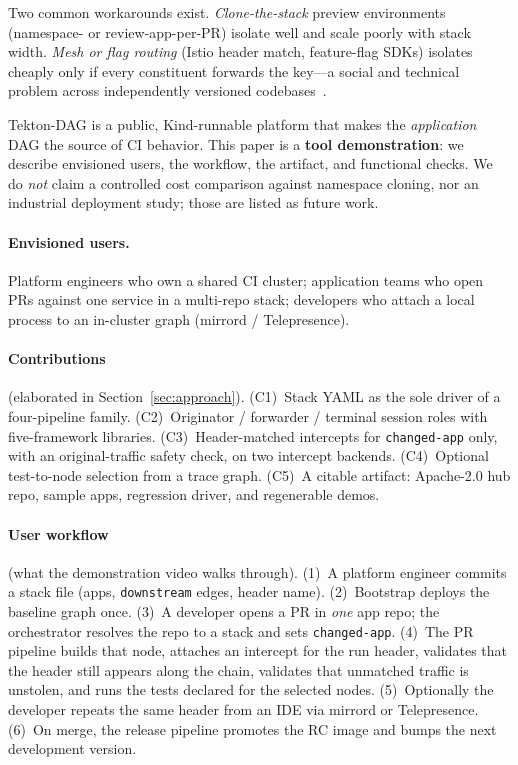 \documentclass[10pt,conference]{IEEEtran}
\begin{document}
Two common workarounds exist. \emph{Clone-the-stack} preview environments (namespace- or review-app-per-PR) isolate well and scale poorly with stack width. \emph{Mesh or flag routing} (Istio header match, feature-flag SDKs) isolates cheaply only if every constituent forwards the key---a social and technical problem across independently versioned codebases~\cite{dragoni2017microservices}.

Tekton-DAG is a public, Kind-runnable platform that makes the \emph{application} DAG the source of CI behavior. This paper is a \textbf{tool demonstration}: we describe envisioned users, the workflow, the artifact, and functional checks. We do \emph{not} claim a controlled cost comparison against namespace cloning, nor an industrial deployment study; those are listed as future work.

\paragraph{Envisioned users.}
Platform engineers who own a shared CI cluster; application teams who open PRs against one service in a multi-repo stack; developers who attach a local process to an in-cluster graph (mirrord / Telepresence).

\paragraph{Contributions} (elaborated in Section~\ref{sec:approach}).
(C1)~Stack YAML as the sole driver of a four-pipeline family.
(C2)~Originator / forwarder / terminal session roles with five-framework libraries.
(C3)~Header-matched intercepts for \texttt{changed-app} only, with an original-traffic safety check, on two intercept backends.
(C4)~Optional test-to-node selection from a trace graph.
(C5)~A citable artifact: Apache-2.0 hub repo, sample apps, regression driver, and regenerable demos.

\paragraph{User workflow} (what the demonstration video walks through).
(1)~A platform engineer commits a stack file (apps, \texttt{downstream} edges, header name).
(2)~Bootstrap deploys the baseline graph once.
(3)~A developer opens a PR in \emph{one} app repo; the orchestrator resolves the repo to a stack and sets \texttt{changed-app}.
(4)~The PR pipeline builds that node, attaches an intercept for the run header, validates that the header still appears along the chain, validates that unmatched traffic is unstolen, and runs the tests declared for the selected nodes.
(5)~Optionally the developer repeats the same header from an IDE via mirrord or Telepresence.
(6)~On merge, the release pipeline promotes the RC image and bumps the next development version.
\end{document}
